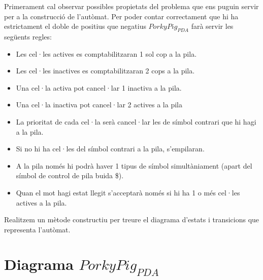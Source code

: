 \documentclass[12pt,a4paper]{report}
\def \pda{$PorkyPig_{PDA} $}
\begin{document}
Primerament cal observar possibles propietats del problema que ens puguin servir per a la construcció de l’autòmat. Per poder contar correctament que hi ha estrictament el doble de positius que negatius \pda{} farà servir les següents regles:

\begin{itemize}
\item Les cel·les actives es comptabilitzaran 1 sol cop a la pila.
\item Les cel·les inactives es comptabilitzaran 2 cops a la pila.
\item Una cel·la activa pot cancel·lar 1 inactiva a la pila.
\item Una cel·la inactiva pot cancel·lar 2 actives a la pila
\item La prioritat de cada cel·la serà cancel·lar les de símbol contrari que hi hagi a la pila.
\item Si no hi ha cel·les del símbol contrari a la pila, s’empilaran.
\item A la pila només hi podrà haver 1 tipus de símbol simultàniament (apart del símbol de control de pila buida \$).
\item Quan el mot hagi estat llegit s’acceptarà només si hi ha 1 o més cel·les actives a la pila.
\end{itemize}

Realitzem un mètode constructiu per treure el diagrama d’estats i transicions que representa l’autòmat.

\section{Diagrama \pda{}}
\end{document}
